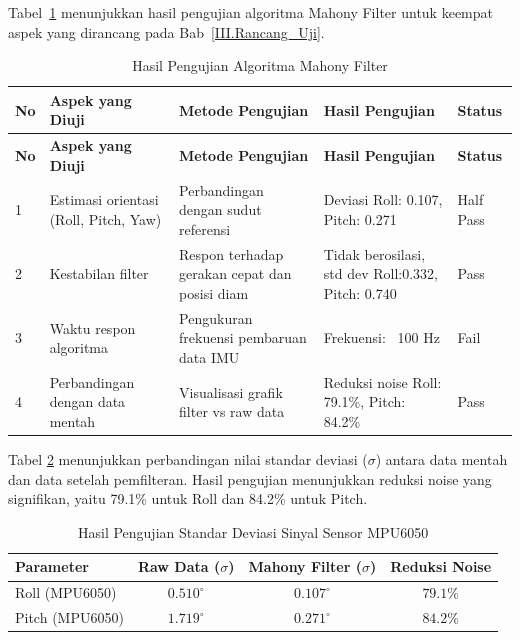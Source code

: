 Tabel~\ref{table:4.mahony_test} menunjukkan hasil pengujian algoritma Mahony Filter untuk keempat aspek yang dirancang pada Bab~\ref{III.Rancang_Uji}.

\begin{longtable}{|p{}|p{}|p{}|p{}|p{}|}
    \caption{Hasil Pengujian Algoritma Mahony Filter}
    \label{table:4.mahony_test} \\
    \hline
    \textbf{No} & \textbf{Aspek yang Diuji} & \textbf{Metode Pengujian} & \textbf{Hasil Pengujian} & \textbf{Status} \\
    \hline
    \endfirsthead
    \hline
    \textbf{No} & \textbf{Aspek yang Diuji} & \textbf{Metode Pengujian} & \textbf{Hasil Pengujian} & \textbf{Status} \\
    \hline
    \endhead
    \hline
    \endfoot
    \hline
    \endlastfoot

    1 & Estimasi orientasi (Roll, Pitch, Yaw) & Perbandingan dengan sudut referensi & Deviasi Roll: 0.107, Pitch: 0.271 & Half Pass \\
    \hline
    2 & Kestabilan filter & Respon terhadap gerakan cepat dan posisi diam & Tidak berosilasi, std dev Roll:0.332, Pitch: 0.740  & Pass \\
    \hline
    3 & Waktu respon algoritma & Pengukuran frekuensi pembaruan data IMU & Frekuensi: ~100 Hz & Fail \\
    \hline
    4 & Perbandingan dengan data mentah & Visualisasi grafik filter vs raw data & Reduksi noise Roll: 79.1\%, Pitch: 84.2\% & Pass \\
    \hline
\end{longtable}

Tabel \ref{table:4.noise_stats} menunjukkan perbandingan nilai standar deviasi ($\sigma$) antara data mentah dan data setelah pemfilteran. Hasil pengujian menunjukkan reduksi noise yang signifikan, yaitu 79.1\% untuk Roll dan 84.2\% untuk Pitch.

\begin{table}[H]
    \centering
    \caption{Hasil Pengujian Standar Deviasi Sinyal Sensor MPU6050}
    \label{table:4.noise_stats}
    \begin{tabular}{|l|c|c|c|}
    \hline
    \textbf{Parameter} & \textbf{Raw Data ($\sigma$)} & \textbf{Mahony Filter ($\sigma$)} & \textbf{Reduksi Noise} \\ \hline
    Roll (MPU6050) & $0.510^\circ$ & $0.107^\circ$ & $79.1\%$ \\ \hline
    Pitch (MPU6050) & $1.719^\circ$ & $0.271^\circ$ & $84.2\%$ \\ \hline
    \end{tabular}
\end{table}

